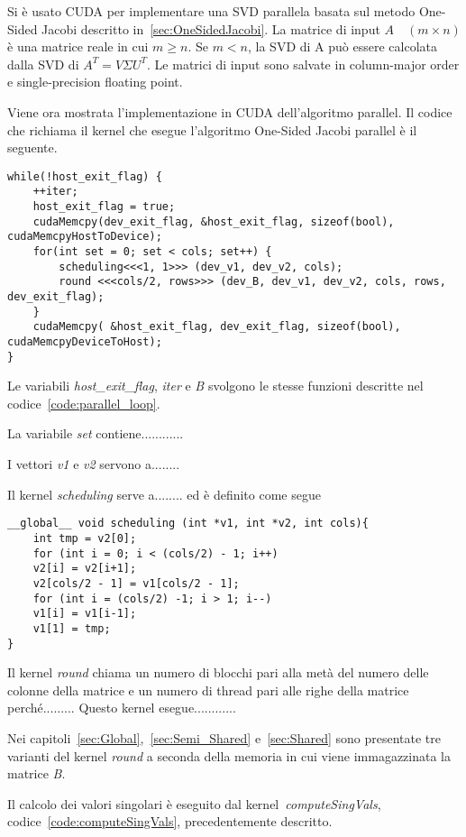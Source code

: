 Si è usato CUDA per implementare una SVD parallela basata sul metodo One-Sided Jacobi descritto in~\ref{sec:OneSidedJacobi}. La matrice di input $A \quad (m \times n)$ è una matrice reale in cui $m \geq n$. Se $m < n$, la SVD di A può essere calcolata dalla SVD di $A^T = V \Sigma U^T$. Le matrici di input sono salvate in column-major order e single-precision floating point. \cite{Romer:SVD}

Viene ora mostrata l'implementazione in CUDA dell'algoritmo parallel. Il codice che richiama il kernel che esegue l'algoritmo One-Sided Jacobi parallel è il seguente.
\begin{lstlisting}[caption=Loop algoritmo parallelo,label=code:parallel_loop]
while(!host_exit_flag) {
	++iter;
	host_exit_flag = true; 
	cudaMemcpy(dev_exit_flag, &host_exit_flag, sizeof(bool), cudaMemcpyHostToDevice);
	for(int set = 0; set < cols; set++) {
		scheduling<<<1, 1>>> (dev_v1, dev_v2, cols);
		round <<<cols/2, rows>>> (dev_B, dev_v1, dev_v2, cols, rows, dev_exit_flag);		
	}
	cudaMemcpy( &host_exit_flag, dev_exit_flag, sizeof(bool), cudaMemcpyDeviceToHost);
}
\end{lstlisting}
Le variabili \textit{host\_exit\_flag}, \textit{iter} e \textit{B} svolgono le stesse funzioni descritte nel codice~\ref{code:parallel_loop}.

La variabile \textit{set} contiene............

I vettori \textit{v1} e  \textit{v2} servono a........

Il kernel \textit{scheduling} serve a........ ed è definito come segue
\begin{lstlisting}
__global__ void scheduling (int *v1, int *v2, int cols){
	int tmp = v2[0];
	for (int i = 0; i < (cols/2) - 1; i++)
	v2[i] = v2[i+1];	
	v2[cols/2 - 1] = v1[cols/2 - 1];
	for (int i = (cols/2) -1; i > 1; i--)
	v1[i] = v1[i-1];	
	v1[1] = tmp;
}
\end{lstlisting}

Il kernel \textit{round} chiama un numero di blocchi pari alla metà del numero delle colonne della matrice e un numero di thread pari alle righe della matrice perché......... Questo kernel esegue............

Nei capitoli~\ref{sec:Global},~\ref{sec:Semi_Shared} e~\ref{sec:Shared} sono presentate tre varianti del kernel \textit{round} a seconda della memoria in cui viene immagazzinata la matrice \textit{B}.

Il calcolo dei valori singolari è eseguito dal kernel~\textit{computeSingVals}, codice~\ref{code:computeSingVals}, precedentemente descritto.